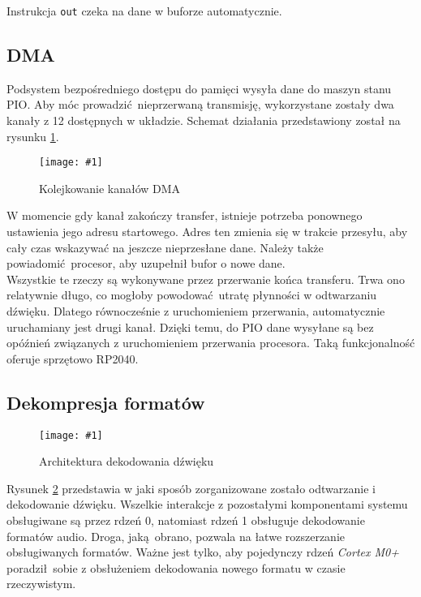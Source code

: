 \documentclass[polish]{aghengthesis}
\newcommand{\imgint}[4]{
	\begin{figure}[{#4}]
		\centering
		\texttt{[image: \#1]}
		\caption{#2}
		\label{#1}
	\end{figure}
}
\newcommand{\imgh}[3]{\imgint{#1}{#2}{#3}{H}}
\begin{document}
			Instrukcja \lstinline|out| czeka na dane w buforze automatycznie.
		
		\subsection{DMA}
			Podsystem bezpośredniego dostępu do pamięci wysyła dane do maszyn stanu PIO. Aby móc prowadzić nieprzerwaną transmisję, wykorzystane zostały dwa kanały z 12 dostępnych w układzie. Schemat działania przedstawiony został na rysunku \ref{3/dma_chain}.
			\imgh{3/dma_chain}{Kolejkowanie kanałów DMA}{0.55}
			
			W momencie gdy kanał zakończy transfer, istnieje potrzeba ponownego ustawienia jego adresu startowego.
			Adres ten zmienia się w trakcie przesyłu, aby cały czas wskazywać na jeszcze nieprzesłane dane.
			Należy także powiadomić procesor, aby uzupełnił bufor o nowe dane.
			$ $\\
			
			Wszystkie te rzeczy są wykonywane przez przerwanie końca transferu.
			Trwa ono relatywnie długo, co mogłoby powodować utratę płynności w odtwarzaniu dźwięku.
			Dlatego równocześnie z uruchomieniem przerwania, automatycznie uruchamiany jest drugi kanał.
			Dzięki temu, do PIO dane wysyłane są bez opóźnień związanych z uruchomieniem przerwania procesora.
			Taką funkcjonalność oferuje sprzętowo RP2040.
		
		\subsection{Dekompresja formatów}
			\label{sec:decode}
%			
		
			\imgh{3/PicoRadio-sound-decoding}{Architektura dekodowania dźwięku}{0.95}
			
			Rysunek \ref{3/PicoRadio-sound-decoding} przedstawia w jaki sposób zorganizowane zostało odtwarzanie i dekodowanie dźwięku. Wszelkie interakcje z pozostałymi komponentami systemu obsługiwane są przez rdzeń 0, natomiast rdzeń 1 obsługuje dekodowanie formatów audio. Droga, jaką obrano, pozwala na łatwe rozszerzanie obsługiwanych formatów. Ważne jest tylko, aby pojedynczy rdzeń \textit{Cortex M0+} poradził sobie z obsłużeniem dekodowania nowego formatu w czasie rzeczywistym.
			
\end{document}
